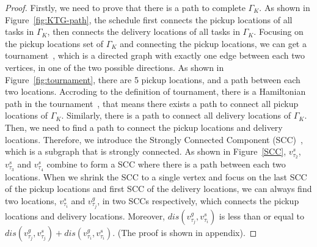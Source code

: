 \documentclass[sigconf,anonymous]{aamas}
\begin{document}
\begin{proof}
    Firstly, we need to prove that there is a path to complete $\Gamma_K$.
    As shown in Figure~\ref{fig:KTG-path},
    the schedule first connects the pickup locations of all tasks in $\Gamma_K$,
    then connects the delivery locations of all tasks in $\Gamma_K$.
    Focusing on the pickup locations set of $\Gamma_K$
    and connecting the pickup locations,
    we can get a tournament~\cite{enwiki:1234378036}, 
    which is a directed graph with exactly one edge between each two vertices, 
    in one of the two possible directions.
    As shown in Figure~\ref{fig:tournament}, 
    there are 5 pickup locations,
    and a path between each two locations.
    Accroding to the definition of tournament,
    there is a Hamiltonian path in the tournament~\cite{enwiki:1234378036},
    that means there exists a path to connect all pickup locations of $\Gamma_K$.
    Similarly, there is a path to connect all delivery locations of $\Gamma_K$.
    Then, we need to find a path to connect the pickup locations and delivery locations.
    Therefore, we introduce the Strongly Connected Component (SCC)~\cite{SCC},
    which is a subgraph that is strongly connected.
    As shown in Figure~\ref{SCC},
    $v^{s}_{\tau_{2}}$, $v^{s}_{\tau_{3}}$ and $v^{s}_{\tau_{4}}$ combine  to form a SCC
    where there is a path between each two locations.
    When we shrink the SCC to a single vertex 
    and focus on the last SCC of the pickup locations and first SCC of the delivery locations,
    we can always find two locations, $v^{s}_{\tau_{i}}$ and $v^{g}_{\tau_{j}}$, in two SCCs respectively,
    which connects the pickup locations and delivery locations.
    Moreover, $dis(v^{g}_{\tau_{j}}, v^{s}_{\tau_{i}})$ is less than or equal to 
    $dis(v^{g}_{\tau_{j}}, v^{s}_{\tau_{j}}) + dis(v^{g}_{\tau_{i}}, v^{s}_{\tau_{i}})$.
    (The proof is shown in appendix).


\end{proof}
\end{document}
